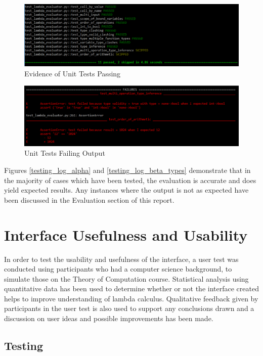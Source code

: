\documentclass[a4paper,11pt]{report}
\begin{document}
\begin{figure}[h]
	\includegraphics[scale=0.66]{images/unit_test_pass}
	\centering
	\caption{Evidence of Unit Tests Passing}
	\label{unit_test_pass}
\end{figure}

\begin{figure}[h]
	\includegraphics[scale=0.6]{images/unit_test_fail}
	\centering
	\caption{Unit Tests Failing Output}
	\label{unit_test_fail}
\end{figure}

Figures \ref{testing_log_alpha} and \ref{testing_log_beta_types} demonstrate that in the majority of cases which have been tested, the evaluation is accurate and does yield expected results. Any instances where the output is not as expected have been discussed in the Evaluation section of this report.

\section{Interface Usefulness and Usability}

In order to test the usability and usefulness of the interface, a user test was conducted using participants who had a computer science background, to simulate those on the Theory of Computation course. Statistical analysis using quantitative data has been used to determine whether or not the interface created helps to improve understanding of lambda calculus. Qualitative feedback given by participants in the user test is also used to support any conclusions drawn and a discussion on user ideas and possible improvements has been made.
\label{interface usefulness and usability}
\subsection{Testing}
\end{document}
